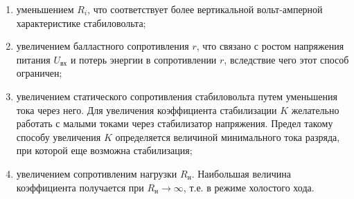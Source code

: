 \documentclass[a4paper, 12pt]{article}
\begin{document}
	\begin{enumerate}
		\item уменьшением $R_i$, что соответствует более вертикальной вольт-амперной характеристике стабиловольта;
		\item увеличением балластного сопротивления $r$, что связано с ростом напряжения питания $U_\text{вх}$ и потерь энергии в сопротивлении $r$, вследствие чего этот способ ограничен;
		\item увеличением статического сопротивления стабиловольта путем уменьшения тока через него. Для увеличения коэффициента стабилизации $K$ желательно работать с малыми токами через стабилизатор напряжения. Предел такому способу увеличения $K$ определяется величиной минимального тока разряда, при которой еще возможна стабилизация;
		\item увеличением сопротивленим нагрузки $R_\text{н}$. Наибольшая величина коэффициента получается при $R_\text{н}\rightarrow\infty$, т.е. в режиме холостого хода.
	\end{enumerate}
\end{document}
